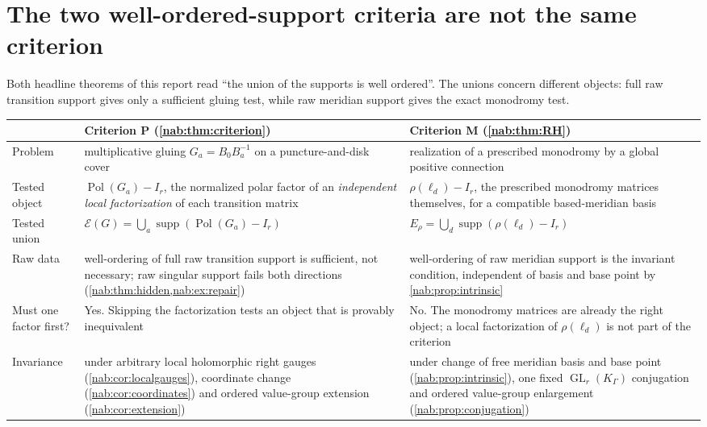 \documentclass[11pt,letterpaper]{article}
\theoremstyle{definition}
\theoremstyle{remark}
\newcommand{\K}{K_\Gamma}
\newcommand{\GL}{\operatorname{GL}}
\newcommand{\supp}{\operatorname{supp}}
\newcommand{\Pol}{\operatorname{Pol}}
\newcommand{\EU}{\mathcal E}
\numberwithin{equation}{section}
\begin{document}
\section{The two well-ordered-support criteria are not the same criterion}
\label{nab:sec:twocriteria}

Both headline theorems of this report read ``the union of the supports is well
ordered''. The unions concern different objects: full raw transition support
gives only a sufficient gluing test, while raw meridian support gives the exact
monodromy test.

\begin{center}\small
\begin{tabular}{@{}L{0.17\textwidth}L{0.38\textwidth}L{0.38\textwidth}@{}}
\toprule
& \textbf{Criterion P} (\cref{nab:thm:criterion}) &
  \textbf{Criterion M} (\cref{nab:thm:RH})\\
\midrule
Problem &
multiplicative gluing $G_a=B_0B_a^{-1}$ on a puncture-and-disk cover &
realization of a prescribed monodromy by a global positive connection\\[0.3em]
Tested object &
$\Pol(G_a)-I_r$, the normalized polar factor of an \emph{independent local
factorization} of each transition matrix &
$\rho(\ell_d)-I_r$, the prescribed monodromy matrices themselves, for a
compatible based-meridian basis\\[0.3em]
Tested union &
$\EU(G)=\bigcup_a\supp(\Pol(G_a)-I_r)$ &
$E_\rho=\bigcup_{d}\supp(\rho(\ell_d)-I_r)$\\[0.3em]
Raw data &
well-ordering of full raw transition support is sufficient, not necessary;
raw singular support fails both directions
(\cref{nab:thm:hidden,nab:ex:repair}) &
well-ordering of raw meridian support is the invariant condition, independent
of basis and base point by \cref{nab:prop:intrinsic}\\[0.3em]
Must one factor first? &
Yes. Skipping the factorization tests an object that is provably inequivalent
&
No. The monodromy matrices are already the right object; a local
factorization of $\rho(\ell_d)$ is not part of the criterion\\[0.3em]
Invariance &
under arbitrary local holomorphic right gauges
(\cref{nab:cor:localgauges}), coordinate change
(\cref{nab:cor:coordinates}) and ordered value-group extension
(\cref{nab:cor:extension}) &
under change of free meridian basis and base point
(\cref{nab:prop:intrinsic}), one fixed $\GL_r(\K)$ conjugation and ordered
value-group enlargement (\cref{nab:prop:conjugation})\\
\bottomrule
\end{tabular}
\end{center}
\end{document}
